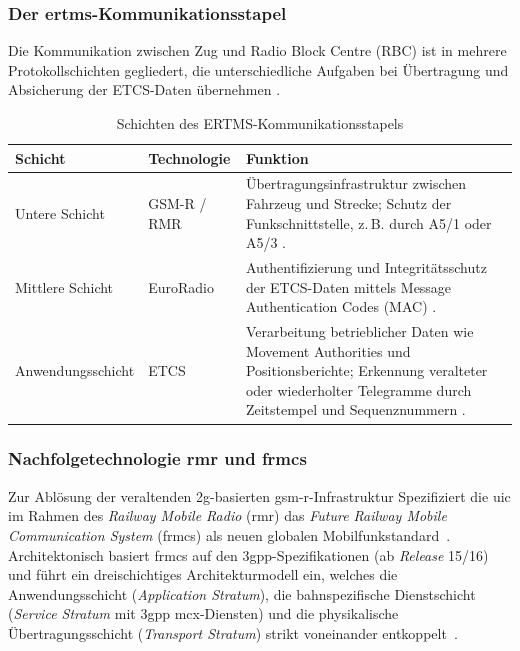 \documentclass[runningheads]{res/llncs}
\begin{document}

\subsubsection{\texorpdfstring{Der \gls{ertms}-Kommunikationsstapel}{Der ERTMS-Kommunikationsstapel}}
\label{sec:Der_ERTMS-Kommunikationsstapel}
Die Kommunikation zwischen Zug und Radio Block Centre (RBC) ist in mehrere Protokollschichten gegliedert, die unterschiedliche Aufgaben bei Übertragung und Absicherung der ETCS-Daten übernehmen \parencite[S.744]{chothiaAttack2017}.

\begin{table}[ht]
\centering
\caption{Schichten des ERTMS-Kommunikationsstapels}
\label{tab:ertms-kommunikationsstapel}
\begin{tabularx}{\textwidth}{@{} l l X @{}}
\toprule
\textbf{Schicht} & \textbf{Technologie} & \textbf{Funktion} \\
\midrule
Untere Schicht
& GSM-R / RMR
& Übertragungsinfrastruktur zwischen Fahrzeug und Strecke; Schutz der
Funkschnittstelle, z.\,B. durch A5/1 oder A5/3
\parencite[S.744, 750]{chothiaAttack2017}. \\

Mittlere Schicht
& EuroRadio
& Authentifizierung und Integritätsschutz der ETCS-Daten mittels
Message Authentication Codes (MAC)
\parencite[S.744, 751]{chothiaAttack2017}. \\

Anwendungsschicht
& ETCS
& Verarbeitung betrieblicher Daten wie Movement Authorities und
Positionsberichte; Erkennung veralteter oder wiederholter Telegramme
durch Zeitstempel und Sequenznummern
\parencite[S.744, 754]{chothiaAttack2017}. \\
\bottomrule
\end{tabularx}
\end{table}

\subsubsection{\texorpdfstring{Nachfolgetechnologie \gls{rmr} und \gls{frmcs}}{Nachfolgetechnologie RMR und FRMCS}}
\label{sec:Nachfolgetechnologie_RMR_und_FRMCS}
Zur Ablösung der veraltenden \gls{2g}-basierten \gls{gsm-r}-Infrastruktur Spezifiziert die \gls{uic} im Rahmen des \textit{Railway Mobile Radio} (\gls{rmr}) das \textit{Future Railway Mobile Communication System} (\gls{frmcs}) als neuen globalen Mobilfunkstandard~\parencite[S. 49, 123]{trinckaufETCS2024}. Architektonisch basiert \gls{frmcs} auf den \gls{3gpp}-Spezifikationen (ab \textit{Release} 15/16) und führt ein dreischichtiges Architekturmodell ein, welches die Anwendungsschicht (\textit{Application Stratum}), die bahnspezifische Dienstschicht (\textit{Service Stratum} mit \gls{3gpp} \gls{mcx}-Diensten) und die physikalische Übertragungsschicht (\textit{Transport Stratum}) strikt voneinander entkoppelt~\parencite[S. 123]{trinckaufETCS2024}. 
\end{document}
